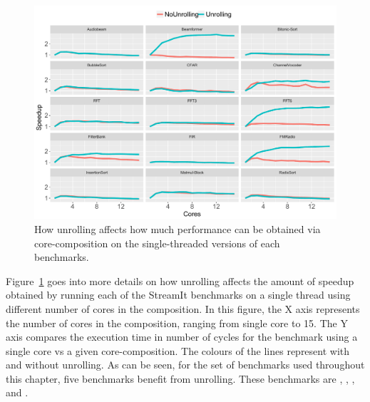 \begin{figure}[t]
  \includegraphics[width=1\textwidth]{streamit-paper/graphics/unroll_speed_bars2.pdf}
  \caption{How unrolling affects how much performance can be obtained via core-composition on the single-threaded versions of each benchmarks.}\label{fig:unroll_summary}
\end{figure}

Figure~\ref{fig:unroll_summary} goes into more details on how unrolling affects the amount of speedup obtained by running each of the StreamIt benchmarks on a single thread using different number of cores in the composition.
In this figure, the X axis represents the number of cores in the composition, ranging from single core to 15.
The Y axis compares the execution time in number of cycles for the benchmark using a single core vs a given core-composition.
The colours of the lines represent with and without unrolling.
As can be seen, for the set of benchmarks used throughout this chapter, five benchmarks benefit from unrolling.
These benchmarks are , , ,  and . 


